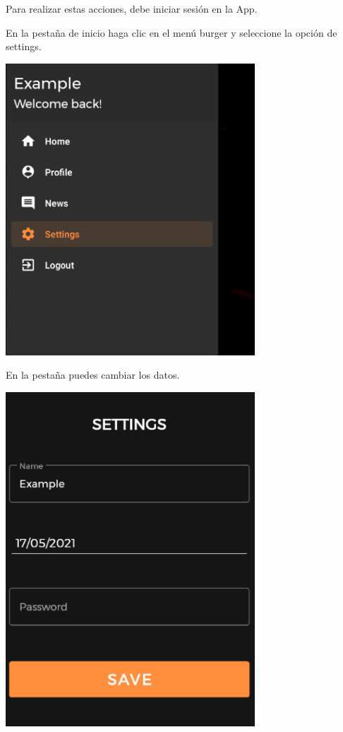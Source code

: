 \documentclass[12pt,a4paper]{article}
\begin{document}
\begin{enumerate}
\item Para realizar estas acciones, debe iniciar sesión en la App.

\begin{minipage}{.60\textwidth}
  \item En la pestaña de inicio haga clic en el menú burger y seleccione la opción de settings.
\end{minipage}
\begin{minipage}{.40\textwidth}
  \includegraphics[width=0.7\textwidth, right]{selecionasettings}
\end{minipage}

\begin{minipage}{.60\textwidth}
  \item En la pestaña puedes cambiar los datos.
\end{minipage}
\begin{minipage}{.40\textwidth}
  \includegraphics[width=0.7\textwidth, right]{cambiardatossettings}
\end{minipage}


\end{enumerate}
\end{document}
